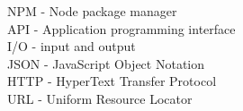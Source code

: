 NPM - Node package manager\\
API - Application programming interface\\
I/O - input and output\\
JSON - JavaScript Object Notation\\
HTTP - HyperText Transfer Protocol\\
URL - Uniform Resource Locator\\


